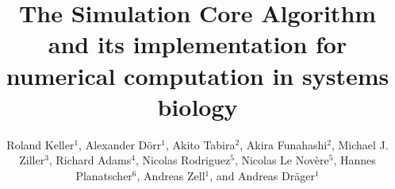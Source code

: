 \documentclass[10pt]{bmc_article}
\newenvironment{bmcformat}{\baselineskip20pt\sloppy\setboolean{publ}{false}}{\baselineskip20pt\sloppy}
\begin{document}
\begin{bmcformat}



\title{The Simulation Core Algorithm and its implementation for numerical
computation in systems biology}
 


\author{%
Roland Keller$^{1}$\correspondingauthor{}, 
Alexander D\"orr$^{1}$\correspondingauthor{},  
Akito Tabira$^{2}$, %
Akira Funahashi$^{2}$, %
Michael J. Ziller$^{3}$, %
Richard Adams$^{4}$, %
Nicolas Rodriguez$^{5}$, %
Nicolas Le Nov\`{e}re$^{5}$, %
Hannes Planatscher$^{6}$, %
Andreas Zell$^{1}$, %
and Andreas Dr\"ager$^{1}$\correspondingauthor{}%
}


\address{%
\iid(1)Center for Bioinformatics Tuebingen (ZBIT), University of
Tuebingen, T\"ubingen, Germany
\iid(2)Keio University, Graduate School of
Science and Technology, Yokohama, Japan 
\iid(3)Department of Stem Cell and Regenerative Biology, Harvard University,
Cambridge, MA, USA
\iid(4)SynthSys Edinburgh, CH Waddington Building, University of Edinburgh,
Edinburgh EH9 3JD, UK
\iid(5)European Bioinformatics Institute, Wellcome Trust Genome Campus, Hinxton,
Cambridge, UK
\iid(6)Natural and Medical Sciences Institute at the University of Tuebingen,
Reutlingen, Germany}


\end{bmcformat}
\end{document}
